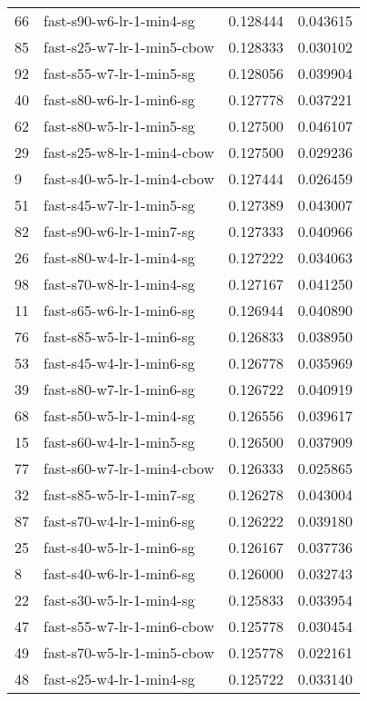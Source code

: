 {\begin{tabular}{llrr}
66 &     fast-s90-w6-lr-1-min4-sg &  0.128444 &  0.043615 \\
85 &   fast-s25-w7-lr-1-min5-cbow &  0.128333 &  0.030102 \\
92 &     fast-s55-w7-lr-1-min5-sg &  0.128056 &  0.039904 \\
40 &     fast-s80-w6-lr-1-min6-sg &  0.127778 &  0.037221 \\
62 &     fast-s80-w5-lr-1-min5-sg &  0.127500 &  0.046107 \\
29 &   fast-s25-w8-lr-1-min4-cbow &  0.127500 &  0.029236 \\
9  &   fast-s40-w5-lr-1-min4-cbow &  0.127444 &  0.026459 \\
51 &     fast-s45-w7-lr-1-min5-sg &  0.127389 &  0.043007 \\
82 &     fast-s90-w6-lr-1-min7-sg &  0.127333 &  0.040966 \\
26 &     fast-s80-w4-lr-1-min4-sg &  0.127222 &  0.034063 \\
98 &     fast-s70-w8-lr-1-min4-sg &  0.127167 &  0.041250 \\
11 &     fast-s65-w6-lr-1-min6-sg &  0.126944 &  0.040890 \\
76 &     fast-s85-w5-lr-1-min6-sg &  0.126833 &  0.038950 \\
53 &     fast-s45-w4-lr-1-min6-sg &  0.126778 &  0.035969 \\
39 &     fast-s80-w7-lr-1-min6-sg &  0.126722 &  0.040919 \\
68 &     fast-s50-w5-lr-1-min4-sg &  0.126556 &  0.039617 \\
15 &     fast-s60-w4-lr-1-min5-sg &  0.126500 &  0.037909 \\
77 &   fast-s60-w7-lr-1-min4-cbow &  0.126333 &  0.025865 \\
32 &     fast-s85-w5-lr-1-min7-sg &  0.126278 &  0.043004 \\
87 &     fast-s70-w4-lr-1-min6-sg &  0.126222 &  0.039180 \\
25 &     fast-s40-w5-lr-1-min6-sg &  0.126167 &  0.037736 \\
8  &     fast-s40-w6-lr-1-min6-sg &  0.126000 &  0.032743 \\
22 &     fast-s30-w5-lr-1-min4-sg &  0.125833 &  0.033954 \\
47 &   fast-s55-w7-lr-1-min6-cbow &  0.125778 &  0.030454 \\
49 &   fast-s70-w5-lr-1-min5-cbow &  0.125778 &  0.022161 \\
48 &     fast-s25-w4-lr-1-min4-sg &  0.125722 &  0.033140 \\

\end{tabular}}
